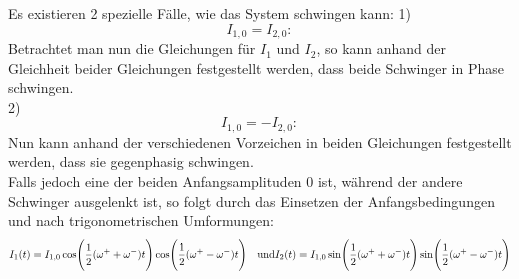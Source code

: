 Es existieren 2 spezielle Fälle, wie das System schwingen kann:
1)
\begin{equation}
    I_{1,0}=I_{2,0}:
\end{equation}
Betrachtet man nun die Gleichungen für \(I_1\) und \(I_2\), so kann anhand der Gleichheit beider Gleichungen festgestellt werden, dass beide Schwinger in Phase schwingen.
\\
2)
\begin{equation}
    I_{1,0}=-I_{2,0}:
\end{equation}
Nun kann anhand der verschiedenen Vorzeichen in beiden Gleichungen festgestellt werden, dass sie gegenphasig schwingen.
\\
Falls jedoch eine der beiden Anfangsamplituden 0 ist, während der andere Schwinger ausgelenkt ist, so folgt durch das Einsetzen der Anfangsbedingungen und nach trigonometrischen Umformungen:
\begin{equation}
    I_1(t)=I_{1,0}\cos\Biggl(\frac{1}{2}(\omega^{+}+\omega^{-})t\Biggr)\cos\Biggl(\frac{1}{2}(\omega^{+}-\omega^{-})t\Biggr)\\
    \quad\textrm{und}\quad\\
    I_2(t)=I_{1,0}\sin\Biggl(\frac{1}{2}(\omega^{+}+\omega^{-})t\Biggr)\sin\Biggl(\frac{1}{2}(\omega^{+}-\omega^{-})t\Biggr)
\end{equation}
